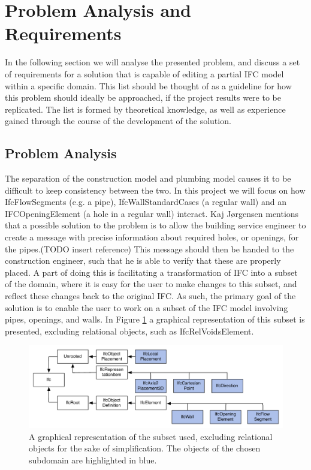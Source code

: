 \section{Problem Analysis and Requirements}
\label{sec:problem_analysis_and_requirements}
In the following section we will analyse the presented problem, and discuss a set of requirements for a solution that is capable of editing a partial IFC model within a specific domain. This list should be thought of as a guideline for how this problem should ideally be approached, if the project results were to be replicated. The list is formed by theoretical knowledge, as well as experience gained through the course of the development of the solution.

\subsection{Problem Analysis}
\label{subsec:problem_analysis}
The separation of the construction model and plumbing model causes it to be difficult to keep consistency between the two. In this project we will focus on how IfcFlowSegments (e.g. a pipe), IfcWallStandardCases (a regular wall) and an IFCOpeningElement (a hole in a regular wall) interact. Kaj Jørgensen mentions that a possible solution to the problem is to allow the building service engineer to create a message with precise information about required holes, or openings, for the pipes.(TODO insert reference) This message should then be handed to the construction engineer, such that he is able to verify that these are properly placed. A part of doing this is facilitating a transformation of IFC into a subset of the domain, where it is easy for the user to make changes to this subset, and reflect these changes back to the original IFC. As such, the primary goal of the solution is to enable the user to work on a subset of the IFC model involving pipes, openings, and walls. In Figure \ref{fig:ifcheirachy} a graphical representation of this subset is presented, excluding relational objects, such as IfcRelVoidsElement.

\begin{figure}[t]
    \centering
        \includegraphics[width=120mm]{images/IfcHeirachy.pdf}
    \caption{A graphical representation of the subset used, excluding relational objects for the sake of simplification. The objects of the chosen subdomain are highlighted in blue.}
    \label{fig:ifcheirachy}
\end{figure}

